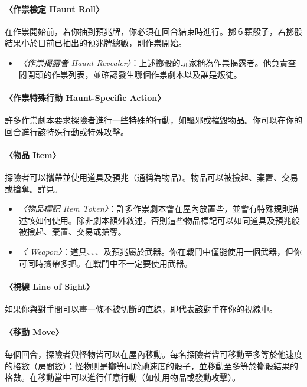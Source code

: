 \paragraph{〈作祟檢定 Haunt Roll〉}
在作祟開始前，若你抽到預兆牌，你必須在回合結束時進行。擲６顆骰子，若擲骰結果小於目前已抽出的預兆牌總數，則作祟開始。

\begin{itemize}
	\item \textit{〈作祟揭露者 Haunt Revealer〉}：上述擲骰的玩家稱為作祟揭露者。他負責查閱開頭的作祟列表，並確認發生哪個作祟劇本以及誰是叛徒。
\end{itemize}

\paragraph{〈作祟特殊行動 Haunt-Specific Action〉}
許多作祟劇本要求探險者進行一些特殊的行動，如驅邪或摧毀物品。你可以在你的回合進行該特殊行動或特殊攻擊。

\paragraph{〈物品 Item〉} \label{glossary:item}
探險者可以攜帶並使用道具及預兆（通稱為物品）。物品可以被撿起、棄置、交易或搶奪。詳見。

\begin{itemize}
	\item \textit{〈物品標記 Item Token〉}：許多作祟劇本會在屋內放置些，並會有特殊規則描述該如何使用。除非劇本額外敘述，否則這些物品標記可以如同道具及預兆般被撿起、棄置、交易或搶奪。
	\item \textit{〈 Weapon〉}：道具、、、及預兆屬於武器。你在戰鬥中僅能使用一個武器，但你可同時攜帶多把。在戰鬥中不一定要使用武器。
\end{itemize}

\paragraph{〈視線 Line of Sight〉} \label{glossary:line-of-sight}
如果你與對手間可以畫一條不被切斷的直線，即代表該對手在你的視線中。

\paragraph{〈移動 Move〉}
每個回合，探險者與怪物皆可以在屋內移動。每名探險者皆可移動至多等於他速度的格數（房間數）；怪物則是擲等同於祂速度的骰子，並移動至多等於擲骰結果的格數。在移動當中可以進行任意行動（如使用物品或發動攻擊）。

